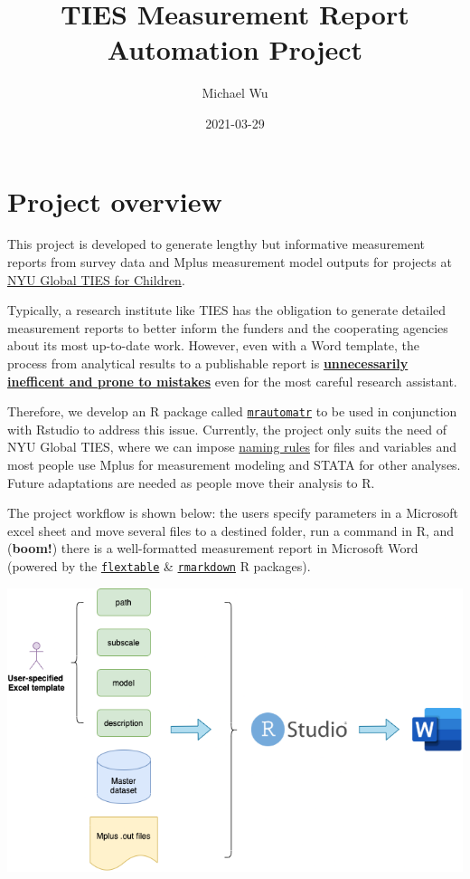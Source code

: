 \documentclass[
]{book}
\title{TIES Measurement Report Automation Project}
\author{Michael Wu}
\date{2021-03-29}
\begin{document}
\maketitle

{
\setcounter{tocdepth}{1}
\tableofcontents
}
\hypertarget{project-overview}{%
\chapter{Project overview}\label{project-overview}}

This project is developed to generate lengthy but informative measurement reports from survey data and Mplus measurement model outputs for projects at \href{https://steinhardt.nyu.edu/ihdsc/global-ties}{NYU Global TIES for Children}.

Typically, a research institute like TIES has the obligation to generate detailed measurement reports to better inform the funders and the cooperating agencies about its most up-to-date work. However, even with a Word template, the process from analytical results to a publishable report is \underline{\textbf{unnecessarily inefficent and prone to mistakes}} even for the most careful research assistant.

Therefore, we develop an R package called \href{https://github.com/nyuglobalties/mrautomatr}{\texttt{mrautomatr}} to be used in conjunction with Rstudio to address this issue. Currently, the project only suits the need of NYU Global TIES, where we can impose \href{https://nyu.box.com/s/ate5l7wmw164u7xjg3g8x1vrfhwnt0ax}{naming rules} for files and variables and most people use Mplus for measurement modeling and STATA for other analyses. Future adaptations are needed as people move their analysis to R.

The project workflow is shown below: the users specify parameters in a Microsoft excel sheet and move several files to a destined folder, run a command in R, and (\textbf{boom!}) there is a well-formatted measurement report in Microsoft Word (powered by the \href{https://davidgohel.github.io/flextable/}{\texttt{flextable}} \& \href{https://bookdown.org/yihui/rmarkdown/}{\texttt{rmarkdown}} R packages).

\begin{center}\includegraphics[width=0.66\linewidth]{images/mrautomatr_diagram} \end{center}
\end{document}
